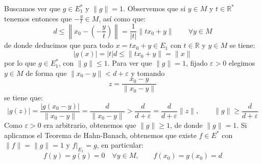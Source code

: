 \documentclass[12pt]{article}
\begin{document}
\begin{ejercicio}[3.5 Puntos]
\begin{description}
                Buscamos ver que $g\in E_1^\ast$ y $\|g\| = 1$. Observemos que si $y\in M$ y $t\in \mathbb{R}^\ast$ tenemos entonces que $-\frac{y}{t}\in M$, así como que:
                \begin{equation*}
                    d \leq \left\|x_0 - \left(-\frac{y}{t}\right)\right\| = \frac{1}{|t|}\|tx_0 + y\| \qquad \forall y\in M
                 \end{equation*}
                 de donde deducimos que para todo $x=tx_0 + y\in E_1$ con $t\in \mathbb{R}$ y $y\in M$ se tiene:
                 \begin{equation*}
                     |g(x)| = |t|d \leq \|tx_0 + y\| = \|x\|
                 \end{equation*}
                 por lo que $g\in E_1^\ast$, con $\|g\|\leq 1$. Para ver que $\|g\|=1$, fijado $\varepsilon>0$ elegimos $y\in M$ de forma que $\|x_0-y\|<d+\varepsilon$ y tomando
                 \begin{equation*}
                     z = \frac{x_0-y}{\|x_0-y\|}
                 \end{equation*}
                 se tiene que:
                 \begin{equation*}
                     |g(z)| = \frac{|g(x_0-y)|}{\|x_0-y\|} = \frac{d}{\|x_0-y\|} > \frac{d}{d+\varepsilon} = \frac{d}{d+\varepsilon}\|z\|, \qquad \|g\|\geq \frac{d}{d+\varepsilon}
                 \end{equation*}
                 Como $\varepsilon>0$ era arbitrario, obtenemos que $\|g\|\geq 1$, de donde $\|g\| = 1$. Si aplicamos el Teorema de Hahn-Banach, obtenemos que existe $f\in E^\ast$ con $\|f\| = \|g\| = 1$ y $f\big|_{E_1} = g$, en particular:
                 \begin{equation*}
                     f(y) = g(y) = 0 \quad \forall y\in M, \qquad f(x_0) = g(x_0) = d
                 \end{equation*}
        \end{description}
    \end{ejercicio}
\end{document}
